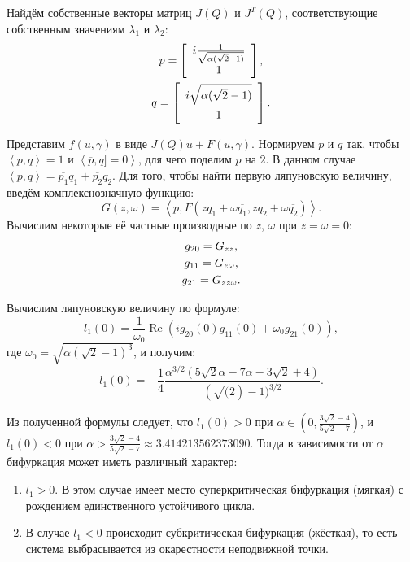 \documentclass[11pt]{article}
\newcommand{\scalar}[2]{\left<#1,#2\right>}
\newcommand{\Real}{\ensuremath{\operatorname{Re}}}
\begin{document}
Найдём собственные векторы матриц $J(Q)$ и $J^T(Q)$, соответствующие собственным значениям $\lambda_1$ и $\lambda_2$:
\begin{gather}
p = \left[ \begin{array}{ccc}
i\frac{1}{\sqrt{\alpha(\sqrt{2} - 1)}} \\[0.5em]
1
\end{array} \right], \notag \\
q = \left[ \begin{array}{ccc}
i\sqrt{\alpha(\sqrt{2} - 1)} \\[0.5em]
1
\end{array} \right]. \notag
\end{gather}

Представим $f(u, \gamma)$ в виде $J(Q)u + F(u, \gamma)$. Нормируем $p$ и $q$ так, чтобы $\scalar{p}{q} = 1$ и $\scalar{\overline{p}}{q] = 0}$, для чего поделим $p$ на $2$. В данном случае $\scalar{p}{q} = \overline{p_1}q_1 + \overline{p_2}q_2$. Для того, чтобы найти первую ляпуновскую величину, введём комплекснозначную функцию:
$$
G(z, \omega) = \scalar{p}{F(zq_1 + \omega\overline{q_1}, zq_2 + \omega\overline{q_2})}.
$$
Вычислим некоторые её частные производные по $z$, $\omega$ при $z = \omega = 0$:
\begin{gather}
g_{20} = G_{zz}, \notag \\
g_{11} = G_{z\omega}, \notag \\
g_{21} = G_{zz\omega}. \notag
\end{gather}

Вычислим ляпуновскую величину по формуле:
$$
l_1(0) = \frac{1}{\omega_0}\Real(ig_{20}(0)g_{11}(0) + \omega_0g_{21}(0)),
$$
где $\omega_0 = \sqrt{\alpha(\sqrt{2} - 1)^3}$, и получим:
$$
l_1(0) = -\frac{1}{4}\frac{\alpha^{3/2}(5\sqrt{2}\alpha - 7\alpha - 3\sqrt{2} + 4)}{(\sqrt(2) - 1)^{3/2}}.
$$

Из полученной формулы следует, что $l_1(0) > 0$ при $\alpha \in \left( 0, \frac{3\sqrt{2} - 4}{5\sqrt{2} - 7} \right)$, и $l_1(0) < 0$ при $\alpha > \frac{3\sqrt{2} - 4}{5\sqrt{2} - 7} \approx 3.414213562373090$. Тогда в зависимости от $\alpha$ бифуркация может иметь различный характер:
\begin{enumerate}
\item
$l_1 > 0$. В этом случае имеет место суперкритическая бифуркация (мягкая) с рождением единственного устойчивого цикла.
\item
В случае $l_1 < 0$ происходит субкритическая бифуркация (жёсткая), то есть система выбрасывается из окарестности неподвижной точки.
\end{enumerate}
\end{document}
